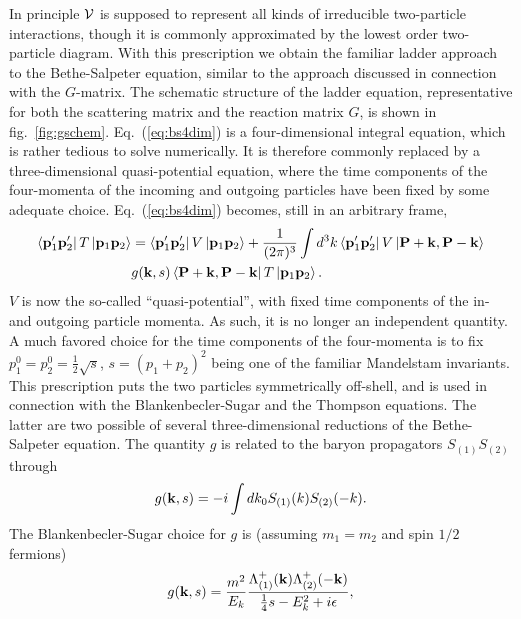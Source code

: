 In principle ${\cal V}$ is supposed to represent all kinds of
irreducible two-particle interactions, though it is commonly
approximated by the lowest order two-particle diagram. With this
prescription we obtain the familiar ladder approach to the Bethe-Salpeter
equation,
similar to the approach discussed in connection with the $G$-matrix. The
schematic structure of the ladder equation, representative for both
the scattering matrix and the reaction matrix $G$, is shown in fig.\
\ref{fig:gschem}.
Eq.\ (\ref{eq:bs4dim}) is a four-dimensional integral equation, which is
rather tedious to solve numerically.
It is therefore commonly replaced by a three-dimensional
quasi-potential equation, where the time components of the four-momenta
of the incoming and outgoing particles have been fixed by some adequate
choice. Eq.\ (\ref{eq:bs4dim}) becomes, still in an arbitrary frame,
\begin{eqnarray}
   \label{eq:bs3dim}
   \left\langle {\bf p}_1'{\bf p}_2' \right|T\left| {\bf p}_1{\bf p}_2 \right\rangle&=
   \left\langle {\bf p}_1'{\bf p}_2' \right|V\left| {\bf p}_1{\bf p}_2 \right\rangle
   +{\displaystyle \frac{1}{(2\pi )^3}\int d^3k}
   \left\langle {\bf p}_1'{\bf p}_2' \right|V
   \left| {\bf P}+{\bf k},{\bf P}-{\bf k} \right\rangle \\ \nonumber
   & g({\bf k},s)
   \left\langle {\bf P}+{\bf k},{\bf P}-{\bf k} \right|
   T\left| {\bf p}_1{\bf p}_2 \right\rangle.
\end{eqnarray}
$V$ is now the so-called ``quasi-potential'', with fixed time components
of the in- and outgoing particle momenta. As such, it is no longer
an independent quantity.
A much favored choice for the time components of the four-momenta is to fix
$p_1^0=p_2^0=\frac{1}{2}\sqrt{s}$, $s=(p_1+p_2)^2$ being one of 
the familiar Mandelstam invariants. This prescription puts the two
particles symmetrically off-shell, and is used in connection with the
Blankenbecler-Sugar \cite{bbs68} and the
Thompson \cite{thomp70} equations. The
latter are two possible of several 
three-dimensional reductions of the 
Bethe-Salpeter equation. The quantity $g$ is 
related to the baryon propagators
$S_{(1)}S_{(2)}$ through
\begin{equation}
     g({\bf k},s)=-i\int dk_0 S_{(1)}(k) S_{(2)}(-k).
\end{equation}
The Blankenbecler-Sugar choice for $g$ is 
(assuming $m_1=m_2$ and spin $1/2$ fermions)
\begin{equation}
   g({\bf k},s)=\frac{m^2}{E_k}
                \frac{\Lambda_{(1)}^+ ({\bf k})\Lambda_{(2)}^+ ({\bf -k})}
                {\frac{1}{4}s -E_k^2 +i\epsilon},
   \label{bbs}
\end{equation}
